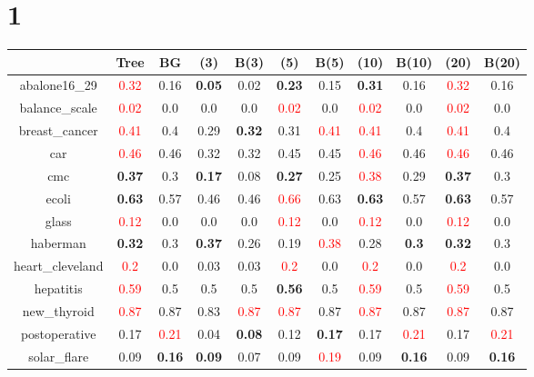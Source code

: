 \documentclass{article}%
\begin{document}
\section*{1}%
\begin{tabular}{c|cccccccccc}%
\hline%
&Tree&BG&(3)&B(3)&(5)&B(5)&(10)&B(10)&(20)&B(20)\\%
\hline%
abalone16\_29&\textcolor{red}{ 
0.32
}&0.16&\textbf{0.05}&0.02&\textbf{0.23}&0.15&\textbf{0.31}&0.16&\textcolor{red}{ 
0.32
}&0.16\\%
\hline%
balance\_scale&\textcolor{red}{ 
0.02
}&0.0&0.0&0.0&\textcolor{red}{ 
0.02
}&0.0&\textcolor{red}{ 
0.02
}&0.0&\textcolor{red}{ 
0.02
}&0.0\\%
\hline%
breast\_cancer&\textcolor{red}{ 
0.41
}&0.4&0.29&\textbf{0.32}&0.31&\textcolor{red}{ 
0.41
}&\textcolor{red}{ 
0.41
}&0.4&\textcolor{red}{ 
0.41
}&0.4\\%
\hline%
car&\textcolor{red}{ 
0.46
}&0.46&0.32&0.32&0.45&0.45&\textcolor{red}{ 
0.46
}&0.46&\textcolor{red}{ 
0.46
}&0.46\\%
\hline%
cmc&\textbf{0.37}&0.3&\textbf{0.17}&0.08&\textbf{0.27}&0.25&\textcolor{red}{ 
0.38
}&0.29&\textbf{0.37}&0.3\\%
\hline%
ecoli&\textbf{0.63}&0.57&0.46&0.46&\textcolor{red}{ 
0.66
}&0.63&\textbf{0.63}&0.57&\textbf{0.63}&0.57\\%
\hline%
glass&\textcolor{red}{ 
0.12
}&0.0&0.0&0.0&\textcolor{red}{ 
0.12
}&0.0&\textcolor{red}{ 
0.12
}&0.0&\textcolor{red}{ 
0.12
}&0.0\\%
\hline%
haberman&\textbf{0.32}&0.3&\textbf{0.37}&0.26&0.19&\textcolor{red}{ 
0.38
}&0.28&\textbf{0.3}&\textbf{0.32}&0.3\\%
\hline%
heart\_cleveland&\textcolor{red}{ 
0.2
}&0.0&0.03&0.03&\textcolor{red}{ 
0.2
}&0.0&\textcolor{red}{ 
0.2
}&0.0&\textcolor{red}{ 
0.2
}&0.0\\%
\hline%
hepatitis&\textcolor{red}{ 
0.59
}&0.5&0.5&0.5&\textbf{0.56}&0.5&\textcolor{red}{ 
0.59
}&0.5&\textcolor{red}{ 
0.59
}&0.5\\%
\hline%
new\_thyroid&\textcolor{red}{ 
0.87
}&0.87&0.83&\textcolor{red}{ 
0.87
}&\textcolor{red}{ 
0.87
}&0.87&\textcolor{red}{ 
0.87
}&0.87&\textcolor{red}{ 
0.87
}&0.87\\%
\hline%
postoperative&0.17&\textcolor{red}{ 
0.21
}&0.04&\textbf{0.08}&0.12&\textbf{0.17}&0.17&\textcolor{red}{ 
0.21
}&0.17&\textcolor{red}{ 
0.21
}\\%
\hline%
solar\_flare&0.09&\textbf{0.16}&\textbf{0.09}&0.07&0.09&\textcolor{red}{ 
0.19
}&0.09&\textbf{0.16}&0.09&\textbf{0.16}\\%

\end{tabular}
\end{document}
